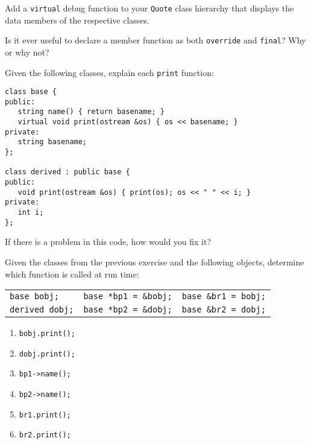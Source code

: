 %
%
\begin{question}
Add a \verb|virtual| debug function to your \verb|Quote| class hierarchy
that displays the data members of the respective classes.
\end{question}

\begin{question}
Is it ever useful to declare a member function as both
\verb|override| and \verb|final|? Why or why not?
\end{question}

\begin{question}
Given the following classes, explain each \verb|print| function:
\begin{lstlisting}
class base {
public:
   string name() { return basename; }
   virtual void print(ostream &os) { os << basename; }
private:
   string basename;
};

class derived : public base {
public:
   void print(ostream &os) { print(os); os << " " << i; }
private:
   int i;
};
\end{lstlisting}
If there is a problem in this code, how would you fix it?
\end{question}

\begin{question}
Given the classes from the previous exercise and the
following objects, determine which function is called at run time:
\begin{table}[H]
\begin{tabular}{lll}
\verb|base bobj;| & \verb|base *bp1 = &bobj;| & \verb|base &br1 = bobj;| \\
\verb|derived dobj;| & \verb|base *bp2 = &dobj;| & \verb|base &br2 = dobj;| \\
\end{tabular}
\end{table}
\begin{enumerate}[label=(\alph*)]
^^I\item \verb|bobj.print();|
^^I\item \verb|dobj.print();|
^^I\item \verb|bp1->name();|
^^I\item \verb|bp2->name();|
^^I\item \verb|br1.print();|
^^I\item \verb|br2.print();|
\end{enumerate}
\end{question}
